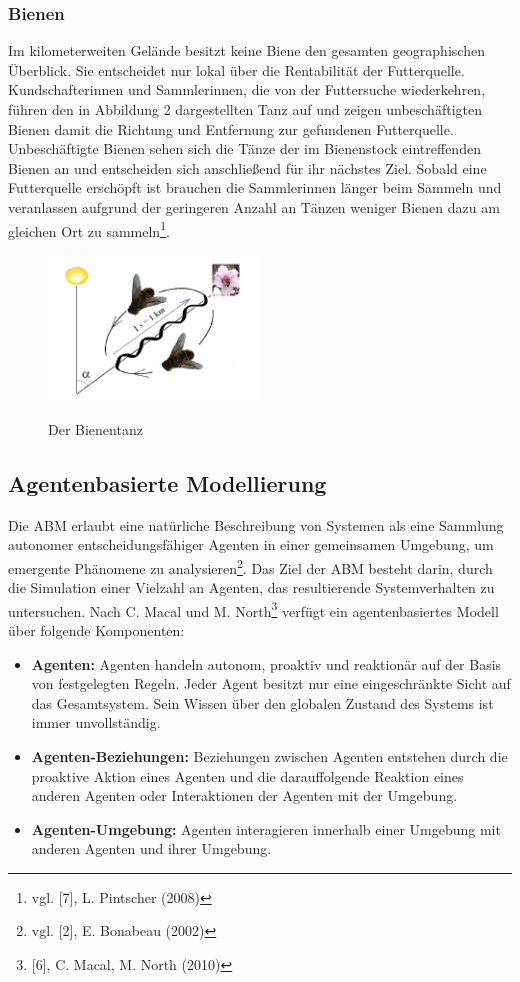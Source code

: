 \documentclass[a4paper, 11pt]{article}
\begin{document}
\subsubsection{Bienen}
Im kilometerweiten Gelände besitzt keine Biene den gesamten geographischen Überblick. Sie entscheidet nur lokal über die Rentabilität der Futterquelle. Kundschafterinnen und Sammlerinnen, die von der Futtersuche wiederkehren, führen den in Abbildung 2 dargestellten Tanz auf und zeigen unbeschäftigten Bienen damit die Richtung und Entfernung zur gefundenen Futterquelle. Unbeschäftigte Bienen sehen sich die Tänze der im Bienenstock eintreffenden Bienen an und entscheiden sich anschließend für ihr nächstes Ziel. Sobald eine Futterquelle erschöpft ist brauchen die Sammlerinnen länger beim Sammeln und veranlassen aufgrund der geringeren Anzahl an Tänzen weniger Bienen dazu am gleichen Ort zu sammeln\footnote{vgl. [7], L. Pintscher (2008)}.
\begin{figure}[h]
	\begin{center}
		\includegraphics[width=0.5\textwidth]{bienentanz}
		\label{defabb}
	\end{center}
	\hspace{1in}\parbox{4in}{\caption[Der Bienentanz]{Der Bienentanz\footnotemark}}
\end{figure}
\newpage
\subsection{Agentenbasierte Modellierung}
Die \ac{ABM} erlaubt eine natürliche Beschreibung von Systemen als eine Sammlung autonomer entscheidungsfähiger Agenten in einer gemeinsamen Umgebung, um emergente Phänomene zu analysieren\footnote{vgl. [2], E. Bonabeau (2002)}. Das Ziel der \acs{ABM} besteht darin, durch die Simulation einer Vielzahl an Agenten, das resultierende Systemverhalten zu untersuchen. Nach C. Macal und M. North\footnote{[6], C. Macal, M. North (2010)} verfügt ein agentenbasiertes Modell über folgende Komponenten:
\begin{itemize}
	\item \textbf{Agenten:} Agenten handeln autonom, proaktiv und reaktionär auf der Basis von festgelegten Regeln. Jeder Agent besitzt nur eine eingeschränkte Sicht auf das Gesamtsystem. Sein Wissen über den globalen Zustand des Systems ist immer unvollständig.
	\item \textbf{Agenten-Beziehungen:} Beziehungen zwischen Agenten entstehen durch die proaktive Aktion eines Agenten und die darauffolgende Reaktion eines anderen Agenten oder Interaktionen der Agenten mit der Umgebung.
	\item \textbf{Agenten-Umgebung:} Agenten interagieren innerhalb einer Umgebung mit anderen Agenten und ihrer Umgebung.
\end{itemize}
\end{document}
